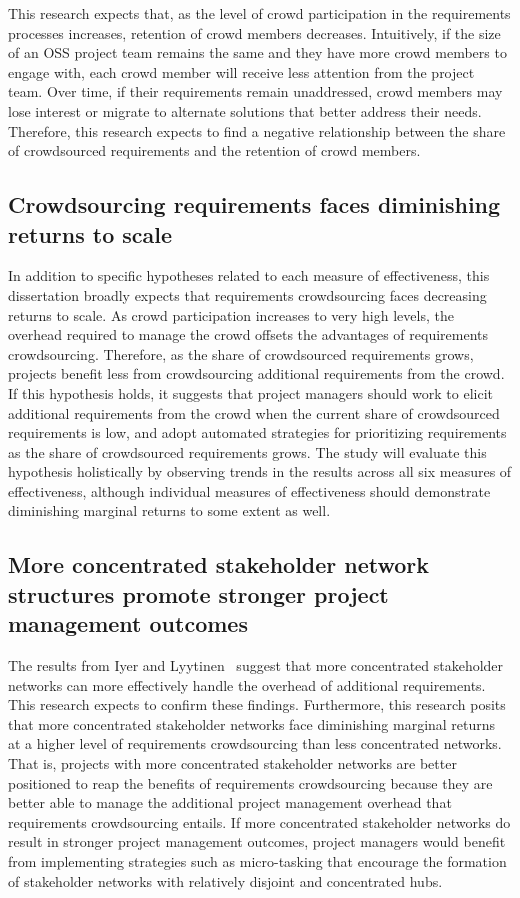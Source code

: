This research expects that, as the level of crowd participation in the requirements processes increases, retention of crowd members decreases. Intuitively, if the size of an OSS project team remains the same and they have more crowd members to engage with, each crowd member will receive less attention from the project team. Over time, if their requirements remain unaddressed, crowd members may lose interest or migrate to alternate solutions that better address their needs. Therefore, this research expects to find a negative relationship between the share of crowdsourced requirements and the retention of crowd members.

\subsection{Crowdsourcing requirements faces diminishing returns to scale}

In addition to specific hypotheses related to each measure of effectiveness, this dissertation broadly expects that requirements crowdsourcing faces decreasing returns to scale. As crowd participation increases to very high levels, the overhead required to manage the crowd offsets the advantages of requirements crowdsourcing. Therefore, as the share of crowdsourced requirements grows, projects benefit less from crowdsourcing additional requirements from the crowd. If this hypothesis holds, it suggests that project managers should work to elicit additional requirements from the crowd when the current share of crowdsourced requirements is low, and adopt automated strategies for prioritizing requirements as the share of crowdsourced requirements grows. The study will evaluate this hypothesis holistically by observing trends in the results across all six measures of effectiveness, although individual measures of effectiveness should demonstrate diminishing marginal returns to some extent as well. 

\subsection{More concentrated stakeholder network structures promote stronger project management outcomes}

The results from Iyer and Lyytinen~\cite{iyer} suggest that more concentrated stakeholder networks can more effectively handle the overhead of additional requirements. This research expects to confirm these findings. Furthermore, this research posits that more concentrated stakeholder networks face diminishing marginal returns at a higher level of requirements crowdsourcing than less concentrated networks. That is, projects with more concentrated stakeholder networks are better positioned to reap the benefits of requirements crowdsourcing because they are better able to manage the additional project management overhead that requirements crowdsourcing entails. If more concentrated stakeholder networks do result in stronger project management outcomes, project managers would benefit from implementing strategies such as micro-tasking that encourage the formation of stakeholder networks with relatively disjoint and concentrated hubs.